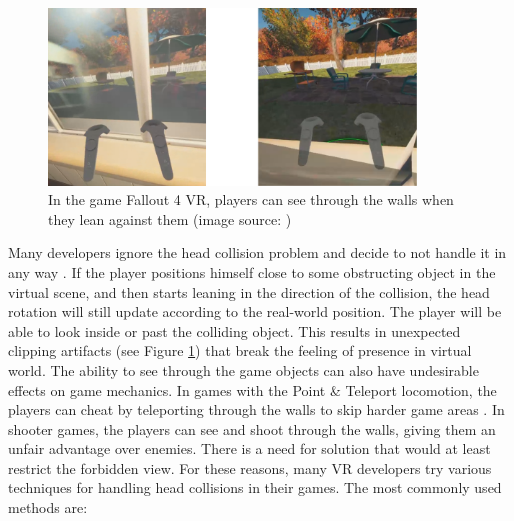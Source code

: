 \begin{figure}[th]
\centering
\includegraphics[width=0.87\textwidth]{img/clipping.png}
\caption{In the game Fallout 4 VR, players can see through the walls when they lean against them (image source: \cite{redditfallout})}
\label{fig:FALLOUTCLIPPING}
\end{figure}

Many developers ignore the head collision problem and decide to not handle it in any way \cite{OCULUSDOCCLIPPING}. If the player positions himself close to some obstructing object in the virtual scene, and then starts leaning in the direction of the collision, the head rotation will still update according to the real-world position. The player will be able to look inside or past the colliding object. This results in unexpected clipping artifacts (see Figure \ref{fig:FALLOUTCLIPPING}) that break the feeling of presence in virtual world. The ability to see through the game objects can also have undesirable effects on game mechanics. In games with the Point \& Teleport locomotion, the players can cheat by teleporting through the walls to skip harder game areas \cite{SKYRIMTELEPORT}. In shooter games, the players can see and shoot through the walls, giving them an unfair advantage over enemies. There is a need for solution that would at least restrict the forbidden view. For these reasons, many VR developers try various techniques for handling head collisions in their games. The most commonly used methods are:

